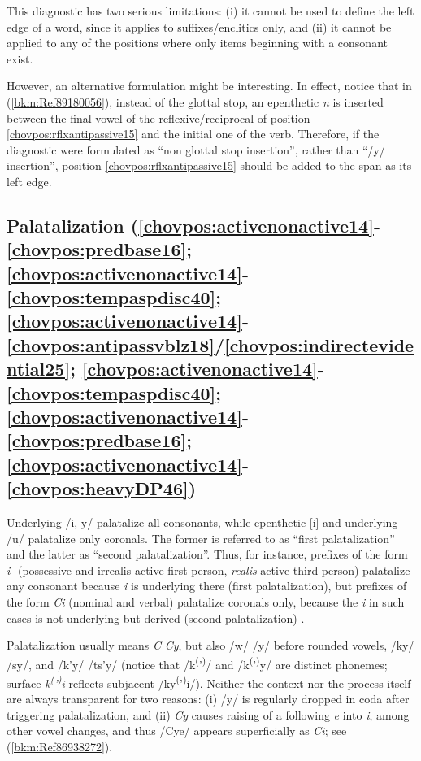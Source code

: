 \documentclass[output=paper]{langscibook}
\begin{document}
This diagnostic has two serious limitations: (i) it cannot be used to define the left edge of a word, since it applies to suffixes/enclitics only, and (ii) it cannot be applied to any of the positions where only items beginning with a consonant exist. 

However, an alternative formulation might be interesting. In effect, notice that in (\ref{bkm:Ref89180056}), instead of the glottal stop, an epenthetic \textit{n} is inserted between the final vowel of the reflexive/reciprocal of position \ref{chovpos:rflxantipassive15} and the initial one of the verb. Therefore, if the diagnostic were formulated as ``non glottal stop insertion'', rather than ``/y/ insertion'', position \ref{chovpos:rflxantipassive15} should be added to the span as its left edge.

\subsection{Palatalization (\ref{chovpos:activenonactive14}{}-\ref{chovpos:predbase16}; \ref{chovpos:activenonactive14}{}-\ref{chovpos:tempaspdisc40}; \ref{chovpos:activenonactive14}{}-\ref{chovpos:antipassvblz18}/\ref{chovpos:indirectevidential25}; \ref{chovpos:activenonactive14}{}-\ref{chovpos:tempaspdisc40}; \ref{chovpos:activenonactive14}{}-\ref{chovpos:predbase16}; \ref{chovpos:activenonactive14}{}-\ref{chovpos:heavyDP46})}

Underlying /i, y/ palatalize all consonants, while epenthetic [i] and underlying /u/ palatalize only coronals. The former is referred to as ``first palatalization'' and the latter as ``second palatalization''. Thus, for instance, prefixes of the form \textit{i-} (possessive and irrealis active first person, \textit{realis} active third person) palatalize any consonant because \textit{i} is underlying there (first palatalization), but prefixes of the form \textit{Ci} (nominal and verbal) palatalize coronals only, because the \textit{i} in such cases is not underlying but derived (second palatalization) \citep{Carol2014}.

Palatalization usually means \textit{C} \MVRightarrow{} \textit{Cy}, but also /w/ \MVRightarrow{} /y/ before rounded vowels, /ky/ \MVRightarrow{} /sy/, and /k'y/ \MVRightarrow{}/ts'y/ (notice that /k\textsuperscript{(}'\textsuperscript{)}/ and /k\textsuperscript{(}'\textsuperscript{)}y/ are distinct phonemes; surface \textit{k\textsuperscript{(}}\textit{'\textsuperscript{)}}\textit{i} reflects subjacent /ky\textsuperscript{(}'\textsuperscript{)}i/). Neither the context nor the process itself are always transparent for two reasons: (i) /y/ is regularly dropped in coda after triggering palatalization, and (ii) \textit{Cy} causes raising of a following \textit{e} into \textit{i}, among other vowel changes, and thus /Cye/ appears superficially as \textit{Ci}; see (\ref{bkm:Ref86938272}). 
\end{document}
